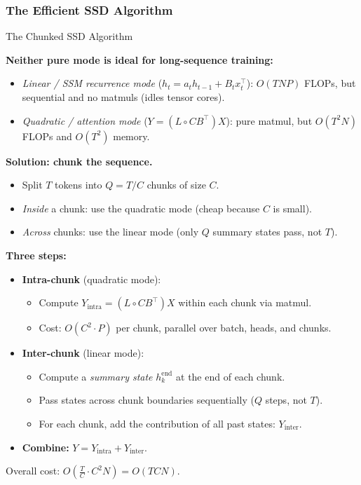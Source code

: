 \subsubsection{The Efficient SSD Algorithm}

\begin{frame}{The Chunked SSD Algorithm}

  \textbf{Neither pure mode is ideal for long-sequence training:}
  \begin{itemize}\itemsep1pt
    \item \emph{Linear / SSM recurrence mode} ($h_t = a_t h_{t-1} + B_t x_t^\top$): $O(TNP)$ FLOPs, but sequential and no matmuls (idles tensor cores).
    \item \emph{Quadratic / attention mode} ($Y = (L \circ CB^\top) X$): pure matmul, but $O(T^2 N)$ FLOPs and $O(T^2)$ memory.
  \end{itemize}

  \vspace{0.4em}
  \textbf{Solution: chunk the sequence.}
  \begin{itemize}\itemsep1pt
    \item Split $T$ tokens into $Q = T / C$ chunks of size $C$.
    \item \emph{Inside} a chunk: use the quadratic mode (cheap because $C$ is small).
    \item \emph{Across} chunks: use the linear mode (only $Q$ summary states pass, not $T$).
  \end{itemize}

  \vspace{0.4em}
  \textbf{Three steps:}
  \begin{itemize}\itemsep1pt
    \item \textbf{Intra-chunk} (quadratic mode):
      \begin{itemize}
        \item Compute $Y_{\text{intra}} = (L \circ CB^\top) X$ within each chunk via matmul.
        \item Cost: $O(C^2 \cdot P)$ per chunk, parallel over batch, heads, and chunks.
      \end{itemize}
    \item \textbf{Inter-chunk} (linear mode):
      \begin{itemize}
        \item Compute a \emph{summary state} $h_k^{\text{end}}$ at the end of each chunk.
        \item Pass states across chunk boundaries sequentially ($Q$ steps, not $T$).
        \item For each chunk, add the contribution of all past states: $Y_{\text{inter}}$.
      \end{itemize}
    \item \textbf{Combine:} $Y = Y_{\text{intra}} + Y_{\text{inter}}$.
  \end{itemize}

  \vspace{0.3em}
  Overall cost: $O\!\left(\tfrac{T}{C} \cdot C^2 N\right) = O(TCN)$.
\end{frame}

